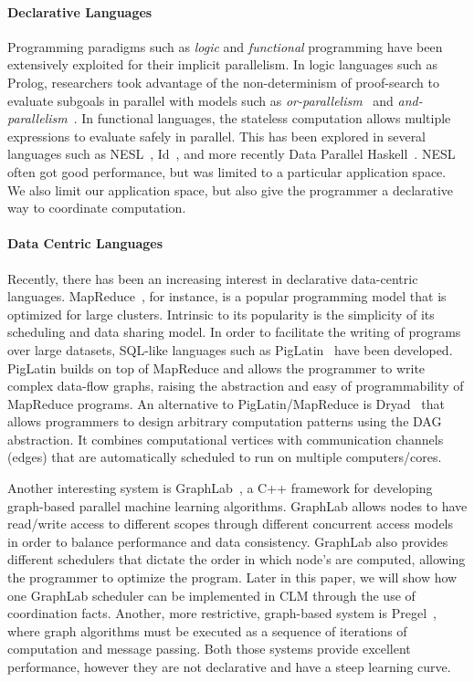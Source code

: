 
\paragraph{Declarative Languages}
Programming paradigms such as \emph{logic} and \emph{functional}
programming have been extensively exploited for their implicit parallelism.
In logic languages such as Prolog, researchers took advantage of the
non-determinism of proof-search to evaluate subgoals in parallel with models
such as \emph{or-parallelism}~\cite{ali-86} and
\emph{and-parallelism}~\cite{Shen-92}.  In functional languages, the stateless
computation allows multiple expressions to evaluate safely in
parallel. This has been explored in several languages such as
NESL~\cite{Blelloch:1996:PPA:227234.227246}, Id~\cite{Nikhil93anoverview}, and
more recently Data Parallel Haskell~\cite{nepal}.
NESL often got good performance, but was limited to a particular
application space. We also limit our application space, but also give the
programmer a declarative way to coordinate computation.

\paragraph{Data Centric Languages}
Recently, there has been an increasing interest in declarative data-centric
languages. MapReduce~\cite{Dean:2008:MSD:1327452.1327492}, for instance, is a
popular programming model that is optimized for large clusters.
Intrinsic to its popularity is the simplicity of its scheduling and data sharing
model.  In order to facilitate the writing of programs over large datasets,
SQL-like languages such as PigLatin~\cite{Olston:2008:PLN:1376616.1376726} have
been developed.  PigLatin builds on top of MapReduce and allows the programmer
to write complex data-flow graphs, raising the abstraction and easy of
programmability of MapReduce programs.  An alternative to PigLatin/MapReduce is
Dryad~\cite{Isard:2007:DDD:1272996.1273005} that allows programmers to design
arbitrary computation patterns using the DAG abstraction. It combines
computational vertices with communication channels (edges) that are
automatically scheduled to run on multiple computers/cores.

Another interesting system is GraphLab~\cite{GraphLab2010}, a C++ framework for developing graph-based parallel machine
learning algorithms. GraphLab allows nodes to have read/write access to
different scopes through different concurrent access models in order to balance
performance and data consistency.  GraphLab also provides different schedulers
that dictate the order in which node's are computed, allowing the programmer to
optimize the program. Later in this paper, we will show how one GraphLab
scheduler can be implemented in CLM through the use of coordination facts.
Another, more restrictive, graph-based system is
Pregel~\cite{Malewicz:2010:PSL:1807167.1807184}, where graph algorithms must be
executed as a sequence of iterations of computation and message passing.
Both those systems provide excellent performance, however they are not
declarative and have a steep learning curve.

